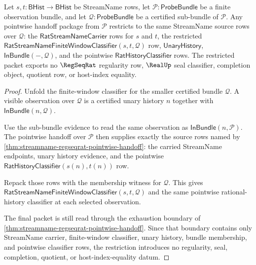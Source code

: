 \begin{theorem}
\label{thm:streamname-regseqrat-finite-window-restriction-handoff}
Let $s,t:\mathsf{BHist}\to\mathsf{BHist}$ be StreamName rows, let
$\mathcal P:\mathsf{ProbeBundle}$ be a finite observation bundle, and let
$\mathcal Q:\mathsf{ProbeBundle}$ be a certified sub-bundle of $\mathcal P$.
Any pointwise handoff package from $\mathcal P$ restricts to the same
StreamName source rows over $\mathcal Q$: the
$\mathsf{RatStreamNameCarrier}$ rows for $s$ and $t$, the restricted
$\mathsf{RatStreamNameFiniteWindowClassifier}(s,t,\mathcal Q)$ row,
$\mathsf{UnaryHistory}$, $\mathsf{InBundle}(-,\mathcal Q)$, and the pointwise
$\mathsf{RatHistoryClassifier}$ rows. The restricted packet exports no
$\RegSeqRat$ regularity row, $\RealUp$ seal classifier, completion object,
quotient row, or host-index equality.
\end{theorem}
\begin{proof}
Unfold the finite-window classifier for the smaller certified bundle
$\mathcal Q$. A visible observation over $\mathcal Q$ is a certified unary
history $n$ together with $\mathsf{InBundle}(n,\mathcal Q)$.

Use the sub-bundle evidence to read the same observation as
$\mathsf{InBundle}(n,\mathcal P)$. The pointwise handoff over $\mathcal P$
then supplies exactly the source rows named by
\autoref{thm:streamname-regseqrat-pointwise-handoff}: the carried StreamName
endpoints, unary history evidence, and the pointwise
$\mathsf{RatHistoryClassifier}(s(n),t(n))$ row.

Repack those rows with the membership witness for $\mathcal Q$. This gives
$\mathsf{RatStreamNameFiniteWindowClassifier}(s,t,\mathcal Q)$ and the same
pointwise rational-history classifier at each selected observation.

The final packet is still read through the exhaustion boundary of
\autoref{thm:streamname-regseqrat-pointwise-handoff}. Since that boundary
contains only StreamName carrier, finite-window classifier, unary history,
bundle membership, and pointwise classifier rows, the restriction introduces
no regularity, seal, completion, quotient, or host-index-equality datum.
\end{proof}

